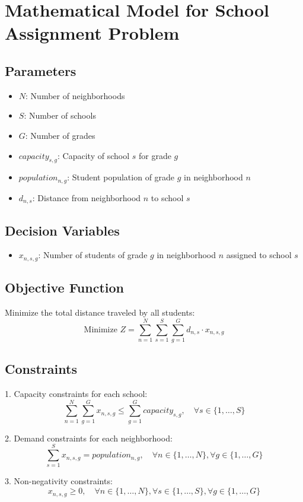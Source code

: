 \documentclass{article}
\begin{document}
\section*{Mathematical Model for School Assignment Problem}

\subsection*{Parameters}
\begin{itemize}
    \item $N$: Number of neighborhoods
    \item $S$: Number of schools
    \item $G$: Number of grades
    \item $capacity_{s,g}$: Capacity of school $s$ for grade $g$
    \item $population_{n,g}$: Student population of grade $g$ in neighborhood $n$
    \item $d_{n,s}$: Distance from neighborhood $n$ to school $s$
\end{itemize}

\subsection*{Decision Variables}
\begin{itemize}
    \item $x_{n,s,g}$: Number of students of grade $g$ in neighborhood $n$ assigned to school $s$
\end{itemize}

\subsection*{Objective Function}
Minimize the total distance traveled by all students:
\[
\text{Minimize } Z = \sum_{n=1}^{N} \sum_{s=1}^{S} \sum_{g=1}^{G} d_{n,s} \cdot x_{n,s,g}
\]

\subsection*{Constraints}

1. Capacity constraints for each school:
\[
\sum_{n=1}^{N} \sum_{g=1}^{G} x_{n,s,g} \leq \sum_{g=1}^{G} capacity_{s,g}, \quad \forall s \in \{1, \ldots, S\}
\]

2. Demand constraints for each neighborhood:
\[
\sum_{s=1}^{S} x_{n,s,g} = population_{n,g}, \quad \forall n \in \{1, \ldots, N\}, \forall g \in \{1, \ldots, G\}
\]

3. Non-negativity constraints:
\[
x_{n,s,g} \geq 0, \quad \forall n \in \{1, \ldots, N\}, \forall s \in \{1, \ldots, S\}, \forall g \in \{1, \ldots, G\}
\]
\end{document}
